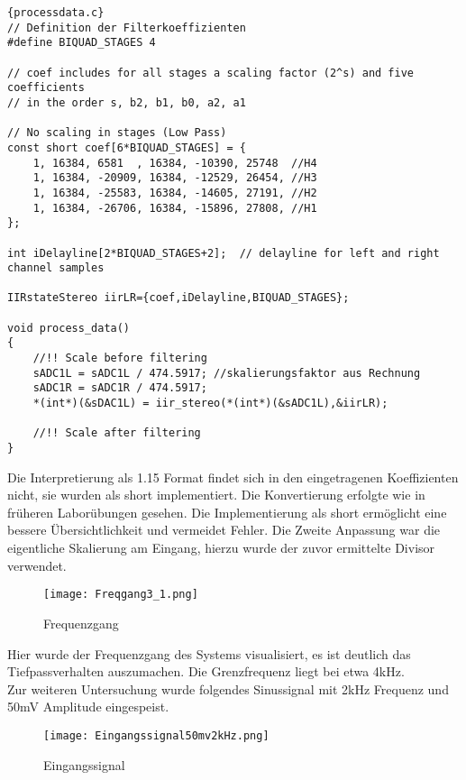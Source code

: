 \begin{adjustbox}{width=\textwidth,height=\textheight,keepaspectratio}
 \begin{lstlisting}[title=processdata.c]{processdata.c}
// Definition der Filterkoeffizienten
#define BIQUAD_STAGES 4

// coef includes for all stages a scaling factor (2^s) and five coefficients
// in the order s, b2, b1, b0, a2, a1

// No scaling in stages (Low Pass)
const short coef[6*BIQUAD_STAGES] = {
	1, 16384, 6581	, 16384, -10390, 25748  //H4
	1, 16384, -20909, 16384, -12529, 26454, //H3
	1, 16384, -25583, 16384, -14605, 27191, //H2
	1, 16384, -26706, 16384, -15896, 27808, //H1
};

int iDelayline[2*BIQUAD_STAGES+2];	// delayline for left and right channel samples

IIRstateStereo iirLR={coef,iDelayline,BIQUAD_STAGES};

void process_data()
{
	//!! Scale before filtering
	sADC1L = sADC1L / 474.5917; //skalierungsfaktor aus Rechnung
	sADC1R = sADC1R / 474.5917;
	*(int*)(&sDAC1L) = iir_stereo(*(int*)(&sADC1L),&iirLR);

	//!! Scale after filtering
}

\end{lstlisting}
\end{adjustbox}
Die Interpretierung als 1.15 Format findet sich in den eingetragenen Koeffizienten nicht, sie wurden als short implementiert. Die Konvertierung erfolgte wie in früheren Laborübungen gesehen. Die Implementierung als short ermöglicht eine bessere Übersichtlichkeit und vermeidet Fehler. Die Zweite Anpassung war die eigentliche Skalierung am Eingang, hierzu wurde der zuvor ermittelte Divisor verwendet.\\
\begin{figure}[H]
  \centering
    \texttt{[image: Freqgang3\_1.png]}
  \caption{Frequenzgang}
  \label{fig:Freqgang3_1}
\end{figure}
Hier wurde der Frequenzgang des Systems visualisiert, es ist deutlich das Tiefpassverhalten auszumachen. Die Grenzfrequenz liegt bei etwa 4kHz.\\
Zur weiteren Untersuchung wurde folgendes Sinussignal mit 2kHz Frequenz und 50mV Amplitude eingespeist.
\begin{figure}[H]
  \centering
    \texttt{[image: Eingangssignal50mv2kHz.png]}
  \caption{Eingangssignal}
  \label{fig:Eingangssignal50mv2kHz}
\end{figure}
